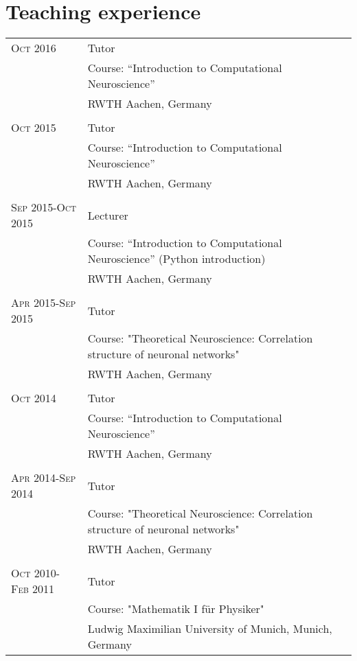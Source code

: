 \documentclass[a4paper,10pt]{article}
\begin{document}
\section{Teaching experience}
\begin{longtable}{>{\hfill}p{3.15cm}|p{10.4cm}}
  \textsc{Oct} 2016 & Tutor \\
  & \footnotesize Course: ``Introduction to Computational Neuroscience'' \\
  & \footnotesize RWTH Aachen, Germany \\
  \multicolumn{2}{c}{} \\
  \textsc{Oct} 2015 & Tutor \\
  & \footnotesize Course: ``Introduction to Computational Neuroscience'' \\
  & \footnotesize RWTH Aachen, Germany \\
  \multicolumn{2}{c}{} \\
  \textsc{Sep} 2015-\textsc{Oct} 2015 & Lecturer \\
  & \footnotesize Course: ``Introduction to Computational Neuroscience'' (Python introduction) \\
  & \footnotesize RWTH Aachen, Germany \\
  \multicolumn{2}{c}{} \\
  \textsc{Apr} 2015-\textsc{Sep} 2015 & Tutor \\ 
  & \footnotesize Course: "Theoretical Neuroscience: Correlation structure of neuronal networks" \\
  & \footnotesize RWTH Aachen, Germany \\
  \multicolumn{2}{c}{} \\
  \textsc{Oct} 2014 & Tutor \\
  & \footnotesize Course: ``Introduction to Computational Neuroscience'' \\
  & \footnotesize RWTH Aachen, Germany \\
  \multicolumn{2}{c}{} \\
  \textsc{Apr} 2014-\textsc{Sep} 2014 & Tutor \\ 
  & \footnotesize Course: "Theoretical Neuroscience: Correlation structure of neuronal networks" \\
  & \footnotesize RWTH Aachen, Germany \\
  \multicolumn{2}{c}{} \\
  \textsc{Oct} 2010-\textsc{Feb} 2011 & Tutor \\
  & \footnotesize Course: "Mathematik I f\"ur Physiker" \\
  & \footnotesize Ludwig Maximilian University of Munich, Munich, Germany \\
\end{longtable}
\end{document}
